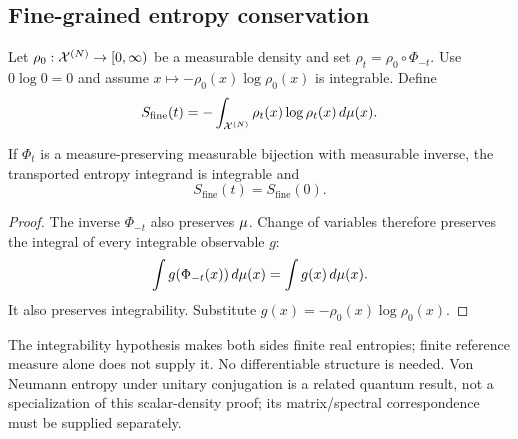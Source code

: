 \subsection{Fine-grained entropy conservation}

Let $\rho_0:\mathcal{X}^{(N)}\to[0,\infty)$ be a measurable density and
set $\rho_t=\rho_0\circ\Phi_{-t}$. Use $0\log0=0$ and assume
$x\mapsto-\rho_0(x)\log\rho_0(x)$ is integrable. Define
\begin{equation}
  S_{\mathrm{fine}}(t)
    =-\int_{\mathcal{X}^{(N)}}\rho_t(x)\log\rho_t(x)\,d\mu(x).
  \label{eq:fine-grained-entropy}
\end{equation}

\begin{theorem}\label{thm:conservation}
If $\Phi_t$ is a measure-preserving measurable bijection with
measurable inverse, the transported entropy integrand is integrable and
\begin{equation}
  S_{\mathrm{fine}}(t)=S_{\mathrm{fine}}(0).
  \label{eq:entropy-conservation}
\end{equation}
\end{theorem}
\begin{proof}
The inverse $\Phi_{-t}$ also preserves $\mu$. Change of variables
therefore preserves the integral of every integrable observable $g$:
\[
  \int g(\Phi_{-t}(x))\,d\mu(x)
    =\int g(x)\,d\mu(x).
\]
It also preserves integrability. Substitute
$g(x)=-\rho_0(x)\log\rho_0(x)$.
\end{proof}

The integrability hypothesis makes both sides finite real entropies;
finite reference measure alone does not supply it. No differentiable
structure is needed. Von Neumann entropy under unitary conjugation is
a related quantum result, not a specialization of this scalar-density
proof; its matrix/spectral correspondence must be supplied separately.
